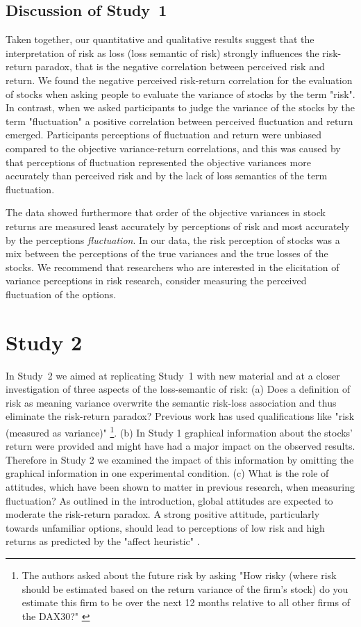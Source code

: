 \documentclass[a4paper,man, natbib,floatsintext]{apa6} %
\begin{document}
\subsection{Discussion of Study~1}
Taken together, our quantitative and qualitative results suggest that the interpretation of risk as loss (loss semantic of risk) strongly influences the risk-return paradox, that is the negative correlation between perceived risk and return. We found the negative perceived risk-return correlation for the evaluation of stocks when asking people to evaluate the variance of stocks by the term "risk". In contrast, when we asked participants to judge the variance of the stocks by the term "fluctuation" a positive correlation between perceived fluctuation and return emerged. Participants perceptions of fluctuation and return were unbiased compared to the objective variance-return correlations, and this was caused by that perceptions of fluctuation represented the objective variances more accurately than perceived risk and by the lack of loss semantics of the term fluctuation.

The data showed furthermore that order of the objective variances in stock returns are measured least accurately by perceptions of risk and most accurately by the perceptions \textit{fluctuation}. In our data, the risk perception of stocks was a mix between the perceptions of the true variances and the true losses of the stocks. We recommend that researchers who are interested in the elicitation of variance perceptions in risk research, consider measuring the perceived fluctuation of the options.


\section{Study 2}
 In Study~2 we aimed at replicating Study~1 with new material and at a closer investigation of three aspects of the loss-semantic of risk: (a) Does a definition of risk as meaning variance overwrite the semantic risk-loss association and thus eliminate the risk-return paradox? Previous work has used qualifications like "risk (measured as variance)" \citep[e.g.,][]{Kempf2014a}\footnote{The authors asked about the future risk by asking "How risky (where risk should be estimated based on the return variance of the firm’s stock) do you estimate this firm to be over the next 12 months relative to all other firms of the DAX30?" \citep[][p. 1007]{Kempf2014}}. (b) In Study 1 graphical information about the stocks' return were provided and might have had a major impact on the observed results. Therefore in Study 2 we examined the impact of this information by omitting the graphical information in one experimental condition. (c) What is the role of attitudes, which have been shown to matter in previous research, when measuring fluctuation? As outlined in the introduction, global attitudes are expected to moderate the risk-return paradox. A strong positive attitude, particularly towards unfamiliar options, should lead to perceptions of low risk and high returns as predicted by the "affect heuristic" \citep[][]{Finucane2000}.
\end{document}
